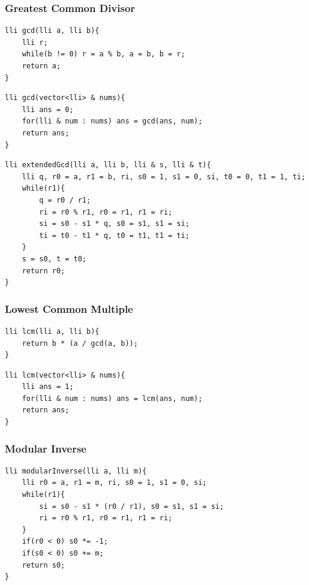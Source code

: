 \documentclass[twoside]{article}
\begin{document}
\begin{multicols*}{2}
\subsubsection*{Greatest Common Divisor}
\begin{verbatim}
lli gcd(lli a, lli b){
	lli r;
	while(b != 0) r = a % b, a = b, b = r;
	return a;
}

\end{verbatim}
\vspace{-12pt}
\begin{verbatim}
lli gcd(vector<lli> & nums){
	lli ans = 0;
	for(lli & num : nums) ans = gcd(ans, num);
	return ans;
}

\end{verbatim}
\vspace{-12pt}
\begin{verbatim}
lli extendedGcd(lli a, lli b, lli & s, lli & t){
	lli q, r0 = a, r1 = b, ri, s0 = 1, s1 = 0, si, t0 = 0, t1 = 1, ti;
	while(r1){
		q = r0 / r1;
		ri = r0 % r1, r0 = r1, r1 = ri;
		si = s0 - s1 * q, s0 = s1, s1 = si;
		ti = t0 - t1 * q, t0 = t1, t1 = ti;
	}
	s = s0, t = t0;
	return r0;
}

\end{verbatim}

\subsubsectionfont{\large\bfseries\sffamily\underline}
\subsubsection*{Lowest Common Multiple}
\begin{verbatim}
lli lcm(lli a, lli b){
	return b * (a / gcd(a, b));
}

\end{verbatim}
\vspace{-12pt}
\begin{verbatim}
lli lcm(vector<lli> & nums){
	lli ans = 1;
	for(lli & num : nums) ans = lcm(ans, num);
	return ans;
}

\end{verbatim}

\subsubsectionfont{\large\bfseries\sffamily\underline}
\subsubsection*{Modular Inverse}
\begin{verbatim}
lli modularInverse(lli a, lli m){
	lli r0 = a, r1 = m, ri, s0 = 1, s1 = 0, si;
	while(r1){
		si = s0 - s1 * (r0 / r1), s0 = s1, s1 = si;
		ri = r0 % r1, r0 = r1, r1 = ri;
	}
	if(r0 < 0) s0 *= -1;
	if(s0 < 0) s0 += m;
	return s0;
}


\end{verbatim}
\end{multicols*}
\end{document}

